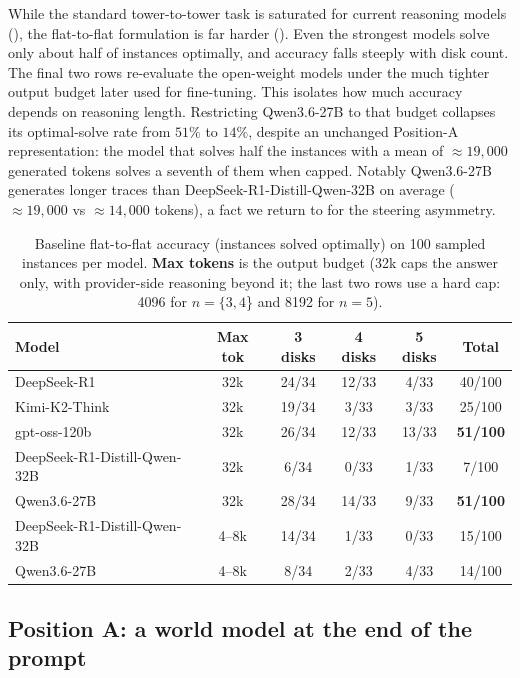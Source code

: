 \documentclass{article} %
\begin{document}
While the standard tower-to-tower task is saturated for current reasoning models (), the flat-to-flat formulation is far harder (). Even the strongest models solve only about half of instances optimally, and accuracy falls steeply with disk count. The final two rows re-evaluate the open-weight models under the much tighter output budget later used for fine-tuning. This isolates how much accuracy depends on reasoning length. Restricting Qwen3.6-27B to that budget collapses its optimal-solve rate from $51\%$ to $14\%$, despite an unchanged Position-A representation: the model that solves half the instances with a mean of $\approx19{,}000$ generated tokens solves a seventh of them when capped. Notably Qwen3.6-27B generates longer traces than DeepSeek-R1-Distill-Qwen-32B on average ($\approx19{,}000$ vs $\approx14{,}000$ tokens), a fact we return to for the steering asymmetry.

\begin{table}[t]
\centering
\caption{Baseline flat-to-flat accuracy (instances solved optimally) on 100 sampled instances per model. \textbf{Max tokens} is the output budget (32k caps the answer only, with provider-side reasoning beyond it; the last two rows use a hard cap: 4096 for $n= \{3, 4$\} and 8192 for $n = 5$).}
\label{tab:flatflat}
\begin{tabular}{lccccc}
\toprule
\textbf{Model} & \textbf{Max tok} & \textbf{3 disks} & \textbf{4 disks} & \textbf{5 disks} & \textbf{Total} \\
\midrule
DeepSeek-R1                  & 32k & 24/34 & 12/33 & 4/33  & 40/100 \\
Kimi-K2-Think                & 32k & 19/34 & 3/33  & 3/33  & 25/100 \\
gpt-oss-120b                 & 32k & 26/34 & 12/33 & 13/33 & \textbf{51/100} \\
\midrule
DeepSeek-R1-Distill-Qwen-32B & 32k & 6/34  & 0/33  & 1/33  & 7/100 \\
Qwen3.6-27B                  & 32k & 28/34 & 14/33 & 9/33  & \textbf{51/100} \\
\midrule
DeepSeek-R1-Distill-Qwen-32B & 4--8k & 14/34 & 1/33 & 0/33 & 15/100 \\
Qwen3.6-27B                  & 4--8k & 8/34  & 2/33 & 4/33 & 14/100 \\
\bottomrule
\end{tabular}
\end{table}

\subsection{Position A: a world model at the end of the prompt}
\label{sec:lrm-posA}
\end{document}
